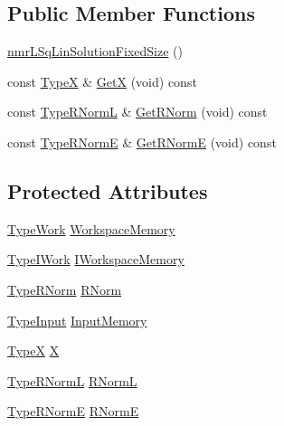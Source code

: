 \subsection*{Public Member Functions}
\begin{DoxyCompactItemize}
\item 
\hyperlink{classnmr_l_sq_lin_solution_fixed_size_a3060f6d235cfc41dbeefe8d8dbc50ba3}{nmr\-L\-Sq\-Lin\-Solution\-Fixed\-Size} ()
\item 
const \hyperlink{classnmr_l_sq_lin_solution_fixed_size_aa00d3b54073dac6aba6e3793d4f88348}{Type\-X} \& \hyperlink{classnmr_l_sq_lin_solution_fixed_size_ac71994a5fb212ccf098e14e56656a258}{Get\-X} (void) const 
\item 
const \hyperlink{classnmr_l_sq_lin_solution_fixed_size_a61e14c469c463bc06a411061aad13b3a}{Type\-R\-Norm\-L} \& \hyperlink{classnmr_l_sq_lin_solution_fixed_size_a4b7c9a9b618661f5d2e60859755eddf4}{Get\-R\-Norm} (void) const 
\item 
const \hyperlink{classnmr_l_sq_lin_solution_fixed_size_a8d12c1d86e766d8b7782e39f38b90073}{Type\-R\-Norm\-E} \& \hyperlink{classnmr_l_sq_lin_solution_fixed_size_aee6661611d7ef29b421f78598c942730}{Get\-R\-Norm\-E} (void) const 
\end{DoxyCompactItemize}
\subsection*{Protected Attributes}
\begin{DoxyCompactItemize}
\item 
\hyperlink{classnmr_l_sq_lin_solution_fixed_size_a2804f3b3815a82a0f9655bcd2f86e7e4}{Type\-Work} \hyperlink{classnmr_l_sq_lin_solution_fixed_size_a3718294e665cb353e17c58bae35e91ef}{Workspace\-Memory}
\item 
\hyperlink{classnmr_l_sq_lin_solution_fixed_size_a1838601b0a3e6fa7972e8854b888152a}{Type\-I\-Work} \hyperlink{classnmr_l_sq_lin_solution_fixed_size_a679c28e537d3e2c4d0be4592715715eb}{I\-Workspace\-Memory}
\item 
\hyperlink{classnmr_l_sq_lin_solution_fixed_size_a384dc1235386018c6edbdc782c5f84be}{Type\-R\-Norm} \hyperlink{classnmr_l_sq_lin_solution_fixed_size_ab8968759e536db86f658fe569aec7c4c}{R\-Norm}
\item 
\hyperlink{classnmr_l_sq_lin_solution_fixed_size_adf9a982c0414dafb9fb1164b8da4f96f}{Type\-Input} \hyperlink{classnmr_l_sq_lin_solution_fixed_size_aabb06ec545a84d0e6cf73353c88d7bba}{Input\-Memory}
\item 
\hyperlink{classnmr_l_sq_lin_solution_fixed_size_aa00d3b54073dac6aba6e3793d4f88348}{Type\-X} \hyperlink{classnmr_l_sq_lin_solution_fixed_size_ae6be321dc3efeb73c08a9b66ca650c59}{X}
\item 
\hyperlink{classnmr_l_sq_lin_solution_fixed_size_a61e14c469c463bc06a411061aad13b3a}{Type\-R\-Norm\-L} \hyperlink{classnmr_l_sq_lin_solution_fixed_size_ae7fc2b92147410b773caab779fefcb66}{R\-Norm\-L}
\item 
\hyperlink{classnmr_l_sq_lin_solution_fixed_size_a8d12c1d86e766d8b7782e39f38b90073}{Type\-R\-Norm\-E} \hyperlink{classnmr_l_sq_lin_solution_fixed_size_a7db2609534904651db0df467d94c13ad}{R\-Norm\-E}
\end{DoxyCompactItemize}
